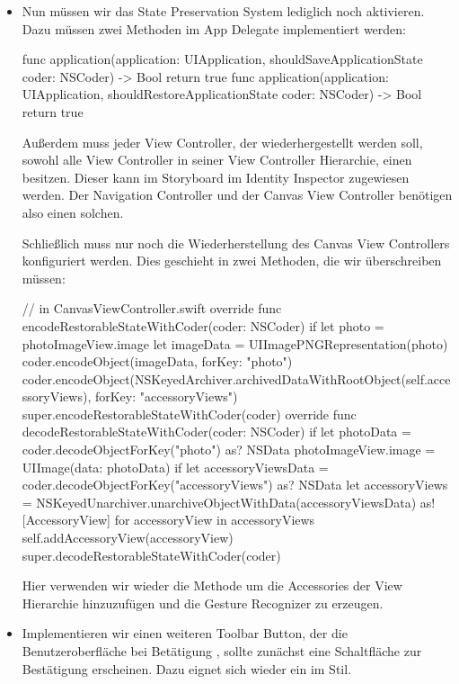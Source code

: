 \documentclass[parskip=half, final]{scrreprt}
\begin{document}
\begin{lecture}
\begin{itemize}
\item Nun müssen wir das State Preservation System lediglich noch aktivieren. Dazu müssen zwei Methoden im App Delegate implementiert werden:
\begin{swiftcode}
    func application(application: UIApplication, shouldSaveApplicationState coder: NSCoder) -> Bool {
        return true
    }
    func application(application: UIApplication, shouldRestoreApplicationState coder: NSCoder) -> Bool {
        return true
    }	
\end{swiftcode}

Außerdem muss jeder View Controller, der wiederhergestellt werden soll, sowohl alle View Controller in seiner View Controller Hierarchie, einen  besitzen. Dieser kann im Storyboard im Identity Inspector zugewiesen werden. Der Navigation Controller und der Canvas View Controller benötigen also einen solchen.

Schließlich muss nur noch die Wiederherstellung des Canvas View Controllers konfiguriert werden. Dies geschieht in zwei Methoden, die wir überschreiben müssen:
\begin{swiftcode}
    // in CanvasViewController.swift
    override func encodeRestorableStateWithCoder(coder: NSCoder) {
        if let photo = photoImageView.image {
            let imageData = UIImagePNGRepresentation(photo)
            coder.encodeObject(imageData, forKey: "photo")
        }
        coder.encodeObject(NSKeyedArchiver.archivedDataWithRootObject(self.accessoryViews), forKey: "accessoryViews")
        super.encodeRestorableStateWithCoder(coder)
    }
    override func decodeRestorableStateWithCoder(coder: NSCoder) {
        if let photoData = coder.decodeObjectForKey("photo") as? NSData {
            photoImageView.image = UIImage(data: photoData)
        }
        if let accessoryViewsData = coder.decodeObjectForKey("accessoryViews") as? NSData {
            let accessoryViews = NSKeyedUnarchiver.unarchiveObjectWithData(accessoryViewsData) as! [AccessoryView]
            for accessoryView in accessoryViews {
                self.addAccessoryView(accessoryView)
            }
        }
        super.decodeRestorableStateWithCoder(coder)
    }	
\end{swiftcode}

Hier verwenden wir wieder die  Methode um die Accessories der View Hierarchie hinzuzufügen und die Gesture Recognizer zu erzeugen.

\item Implementieren wir einen weiteren Toolbar Button, der die Benutzeroberfläche bei Betätigung , sollte zunächst eine Schaltfläche zur Bestätigung erscheinen. Dazu eignet sich wieder ein  im  Stil.


\end{itemize}
\end{lecture}
\end{document}
